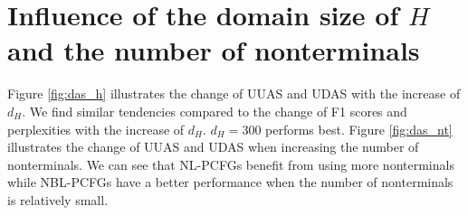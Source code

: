 \documentclass[11pt,a4paper]{article}
\begin{document}
\section{Influence of the domain size of $H$ and the number of nonterminals }
Figure \ref{fig:das_h} illustrates the change of UUAS and UDAS with the increase of $d_H$. We find similar tendencies compared to the change of F1 scores and perplexities with the increase of $d_H$. $d_H = 300$ performs best. Figure \ref{fig:das_nt} illustrates the change of UUAS and UDAS when increasing the number of nonterminals. We can see that NL-PCFGs benefit from using more nonterminals while NBL-PCFGs have a better performance when the number of nonterminals is relatively small. 
\end{document}
